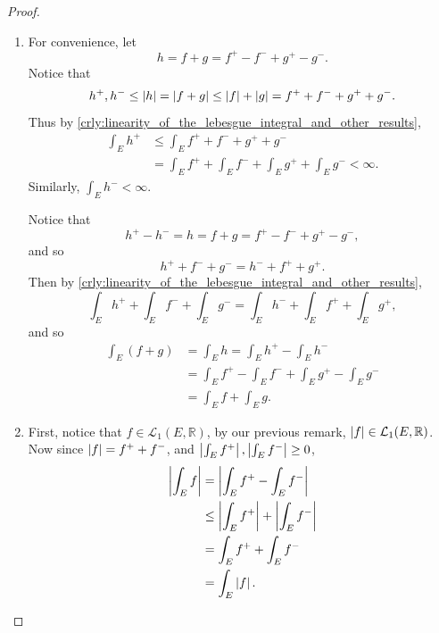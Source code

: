 \documentclass[notoc,notitlepage]{tufte-book}
\begin{document}
\begin{proof}
\begin{enumerate}
    \item {} For convenience,
      let
      \begin{equation*}
        h = f + g = f^+ - f^- + g^+ - g^-.
      \end{equation*}
      Notice that
      \begin{equation*}
        h^+, h^- \leq \left|h\right| = \left|f + g\right|
        \leq \left|f\right| + \left|g\right| = f^+ + f^- + g^+ + g^-.
      \end{equation*}
      Thus by \cref{crly:linearity_of_the_lebesgue_integral_and_other_results},
      \begin{align*}
        \int_{E} h^+ &\leq \int_{E} f^+ + f^- + g^+ + g^- \\
                     &= \int_{E} f^+ + \int_{E} f^- + \int_{E} g^+ + \int_{E}
                     g^- < \infty.
      \end{align*}
      Similarly, $\int_{E} h^- < \infty$.

      \noindent
       Notice that
      \begin{equation*}
        h^+ - h^- = h = f + g = f^+ - f^- + g^+ - g^-,
      \end{equation*}
      and so
      \begin{equation*}
        h^+ + f^- + g^- = h^- + f^+ + g^+.
      \end{equation*}
      Then by \cref{crly:linearity_of_the_lebesgue_integral_and_other_results},
      \begin{equation*}
        \int_{E} h^+ + \int_{E} f^- + \int_{E} g^-
        = \int_{E} h^- + \int_{E} f^+ + \int_{E} g^+,
      \end{equation*}
      and so
      \begin{align*}
        \int_{E} (f + g) &= \int_{E} h = \int_{E} h^+ - \int_{E} h^- \\
                         &= \int_{E} f^+ - \int_{E} f^- + \int_{E} g^+ -
                         \int_{E} g^- \\
                         &= \int_{E} f + \int_{E} g.
      \end{align*}

    \item First, notice that $f \in \mathcal{L}_1(E, \mathbb{R})$, by our
      previous remark, $\left|f\right| \in \mathcal{L}_1(E, \mathbb{R})$. Now since
      $\left|f\right| = f^+ + f^-$, and $\left|\int_{E} f^+\right|, \left|\int_{E} f^-\right| \geq
      0$,
      \begin{align*}
        \left|\int_{E} f\right|
        &= \left| \int_{E} f^+ - \int_{E} f^- \right| \\
        &\leq \left|\int_{E} f^+\right| + \left|\int_{E} f^-\right| \\
        &= \int_{E} f^+ + \int_{E} f^- \\
        &= \int_{E} \left|f\right|.
      \end{align*}
  \end{enumerate}
\end{proof}
\end{document}
